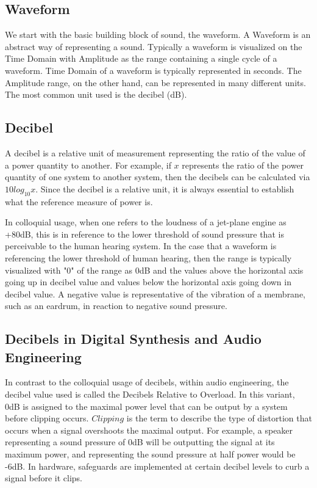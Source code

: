 \documentclass[a4paper,12pt]{report}
\begin{document}
\subsection{Waveform}
\label{subsec:waveform}
We start with the basic building block of sound, the waveform. A Waveform is an abstract way of representing a sound. Typically a waveform is visualized on the Time Domain with Amplitude as the range containing a single cycle of a waveform. Time Domain of a waveform is typically represented in seconds. The Amplitude range, on the other hand, can be represented in many different units. The most common unit used is the decibel (dB). 

\subsection{Decibel}
\label{subsec:decibel}
A decibel is a relative unit of measurement representing the ratio of the value of a power quantity to another. For example, if $x$ represents the ratio of the power quantity of one system to another system, then the decibels can be calculated via $10 log_10 x$. Since the decibel is a relative unit, it is always essential to establish what the reference measure of power is. 

In colloquial usage, when one refers to the loudness of a jet-plane engine as +80dB, this is in reference to the lower threshold of sound pressure that is perceivable to the human hearing system. In the case that a waveform is referencing the lower threshold of human hearing, then the range is typically visualized with "0" of the range as 0dB and the values above the horizontal axis going up in decibel value and values below the horizontal axis going down in decibel value. A negative value is representative of the vibration of a membrane, such as an eardrum, in reaction to negative sound pressure. 

\subsection{Decibels in Digital Synthesis and Audio Engineering}
\label{subsec:decibelindigitalsynthesis}
In contrast to the colloquial usage of decibels, within audio engineering, the decibel value used is called the Decibels Relative to Overload.  In this variant, 0dB is assigned to the maximal power level that can be output by a system before clipping occurs. $Clipping$ is the term to describe the type of distortion that occurs when a signal overshoots the maximal output. For example, a speaker representing a sound pressure of 0dB will be outputting the signal at its maximum power, and representing the sound pressure at half power would be -6dB. In hardware, safeguards are implemented at certain decibel levels to curb a signal before it clips.
\end{document}
